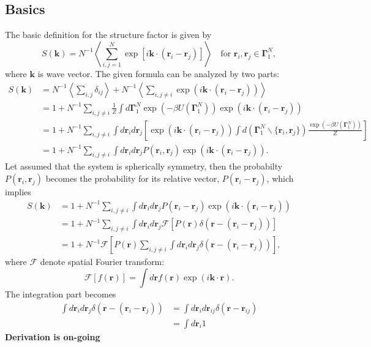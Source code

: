 \documentclass[10pt, a4paper]{report}
\begin{document}
\begin{appendices}
    \subsection{Basics}
    The basic definition for the structure factor is given by
    \begin{equation}
      S(\mathbf{k}) = N^{-1}\left\langle \sum_{i,j=1}^{N}\exp\left[i\mathbf{k}\cdot(\mathbf{r}_i - \mathbf{r}_j)\right] \right\rangle\quad\textrm{for }\mathbf{r}_i,\mathbf{r}_j\in\boldsymbol{\Gamma}_{1}^{N},
    \end{equation}
    where $\mathbf{k}$ is wave vector. The given formula can be analyzed by two parts:
    \begin{align}
      S(\mathbf{k}) &= N^{-1}\left\langle \sum_{i,j}\delta_{ij}\right\rangle + N^{-1}\left\langle \sum_{i, j\neq i}\exp(i\mathbf{k}\cdot(\mathbf{r}_i - \mathbf{r}_j))\right\rangle \\
                    &= 1 + N^{-1}\sum_{i,j\neq i}\frac{1}{Z}\int d\boldsymbol{\Gamma}_{1}^{N}\exp(-\beta U(\boldsymbol{\Gamma}_{1}^{N}))\exp(i\mathbf{k}\cdot(\mathbf{r}_i-\mathbf{r}_j))\\
                    &= 1 + N^{-1}\sum_{i, j\neq i}\int d\mathbf{r}_i d\mathbf{r}_j\left[\exp(i\mathbf{k}\cdot(\mathbf{r}_i-\mathbf{r}_j)) \int d\left(\boldsymbol{\Gamma}_{1}^{N}\backslash\{\mathbf{r}_i,\mathbf{r}_j\}\right)\frac{\exp(-\beta U(\boldsymbol{\Gamma}_{1}^{N}))}{Z}\right]\\
                    &= 1 + N^{-1}\sum_{i,j\neq i}\int d\mathbf{r}_i d\mathbf{r}_j P(\mathbf{r}_i, \mathbf{r}_j) \exp(i\mathbf{k}\cdot(\mathbf{r}_i - \mathbf{r}_j)).
    \end{align}
    Let assumed that the system is spherically symmetry, then the probabilty $P(\mathbf{r}_i, \mathbf{r}_j)$ becomes the probability for its relative vector, $P(\mathbf{r}_i-\mathbf{r}_j)$, which implies
    \begin{align}
      S(\mathbf{k}) &= 1 + N^{-1}\sum_{i,j\neq i}\int d\mathbf{r}_i d\mathbf{r}_j P(\mathbf{r}_i - \mathbf{r}_j)\exp(i\mathbf{k}\cdot(\mathbf{r}_i - \mathbf{r}_j)) \\
      &= 1 + N^{-1}\sum_{i,j\neq i}\int d\mathbf{r}_i d\mathbf{r}_j  \mathscr{F}\left[P(\mathbf{r})\delta(\mathbf{r} - (\mathbf{r}_i - \mathbf{r}_j)) \right] \\
      &= 1 + N^{-1}\mathscr{F}\left[P(\mathbf{r}) \sum_{i,j\neq i}\int d\mathbf{r}_i d\mathbf{r}_j \delta(\mathbf{r} - (\mathbf{r}_i - \mathbf{r}_j)) \right],
    \end{align}
    where $\mathscr{F}$ denote spatial Fourier transform:
    \begin{equation}
      \mathscr{F}[f(\mathbf{r})] = \int d\mathbf{r} f(\mathbf{r})\exp(i\mathbf{k}\cdot\mathbf{r}).
    \end{equation}
    The integration part becomes
    \begin{align}
      \int d\mathbf{r}_i d\mathbf{r}_j \delta(\mathbf{r} - (\mathbf{r}_i - \mathbf{r}_j)) &= \int d\mathbf{r}_i d\mathbf{r}_{ij} \delta(\mathbf{r} - \mathbf{r}_{ij}) \\
      &= \int d\mathbf{r}_i 1
    \end{align}
    \textbf{Derivation is on-going}

\end{appendices}
\end{document}
